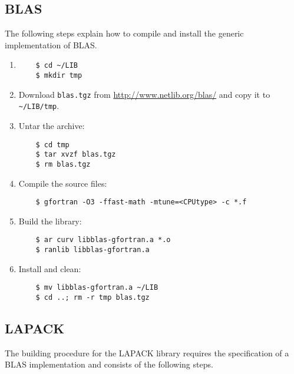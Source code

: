 \documentclass[a4paper,12pt]{article}%
\begin{document}
\subsection{BLAS}

The following steps explain how to compile and install the generic
implementation of BLAS.

\begin{enumerate}
\item 
  \begin{Verbatim}
    $ cd ~/LIB
    $ mkdir tmp
  \end{Verbatim}
\item Download \verb+blas.tgz+ from \url{http://www.netlib.org/blas/}
  and copy it to \verb+~/LIB/tmp+.
\item Untar the archive:
  \begin{Verbatim}
    $ cd tmp
    $ tar xvzf blas.tgz
    $ rm blas.tgz
  \end{Verbatim}
\item Compile the source files:
  \begin{Verbatim}
    $ gfortran -O3 -ffast-math -mtune=<CPUtype> -c *.f
  \end{Verbatim}
\item Build the library:
  \begin{Verbatim}
    $ ar curv libblas-gfortran.a *.o
    $ ranlib libblas-gfortran.a
  \end{Verbatim}
\item Install and clean:
  \begin{Verbatim}
    $ mv libblas-gfortran.a ~/LIB
    $ cd ..; rm -r tmp blas.tgz
  \end{Verbatim}
\end{enumerate}

\subsection{LAPACK}

The building procedure for the LAPACK library requires the
specification of a BLAS implementation and consists of the following
steps.
\end{document}
